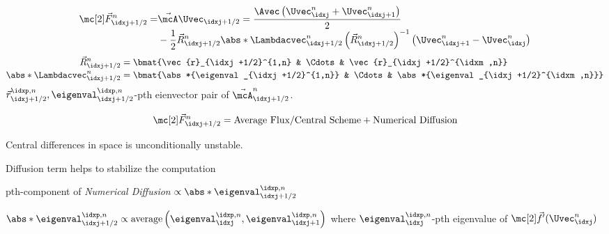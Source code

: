 \begin{defnbox}\nospacing
    \begin{defn}\label{defn:roe_flux_linearized_system}
        \begin{align}
          \Fluxvec_{\idxj+1/2}^{n}=&\linfluxvec\Uvec_{\idxj+1/2}=\frac{\Avec \left(\Uvec_{\idxj}^{n}+\Uvec_{\idxj+1}^{n}\right)}{2}\label{eq:roe_flux_linearized_system}\\[-1\jot]
                                &-\frac{1}{2}\vec{R}_{\idxj+1/2}^{n}\abs*{\Lambdacvec_{\idxj+1/2}^{n}}\left(\vec{R}_{\idxj+1/2}^{n}\right)^{-1}\left(\Uvec_{\idxj+1}^{n}-\Uvec_{\idxj}^{n}\right)\nonumber
        \end{align}
        \begin{align*}
          \vec{R}_{\idxj+1/2}^{n}&=\bmat{\vec{r}_{\idxj+1/2}^{1,n} & \Cdots & \vec{r}_{\idxj+1/2}^{\idxm,n}}\\[-1\jot]
          \abs*{\Lambdacvec_{\idxj+1/2}^{n}}&=\bmat{\abs*{\eigenval_{\idxj+1/2}^{1,n}} & \Cdots & \abs*{\eigenval_{\idxj+1/2}^{\idxm,n}}}
        \end{align*}
        $\vec{r}_{\idxj+1/2}^{\idxp,n}, \eigenval_{\idxj+1/2}^{\idxp,n}$-pth eienvector pair of $\linfluxvec_{\idxj+1/2}^{n}$.
   \end{defn}
\end{defnbox}
\begin{explanationbox}\nospacing
    \begin{explanation}
       \begin{align*}
         \Fluxvec_{\idxj+1/2}^{n}=\text{Average Flux/Central Scheme}+\text{Numerical Diffusion}
       \end{align*}
       \begin{itemizenosep}
           \item Central differences in space is unconditionally unstable.
           \item Diffusion term helps to stabilize the computation
           \item pth-component of \textit{Numerical Diffusion} $\propto\abs*{\eigenval_{\idxj+1/2}^{\idxp,n}}$
           \item $\abs*{\eigenval_{\idxj+1/2}^{\idxp,n}}\propto\text{average}\left(\eigenval_{\idxj}^{\idxp,n},\eigenval_{\idxj+1}^{\idxp,n}\right)$ where
           $\eigenval_{\idxj}^{\idxp,n}$-pth eigenvalue of $\fluxvec'(\Uvec_{\idxj}^{n})$
       \end{itemizenosep}
    \end{explanation}
\end{explanationbox}
